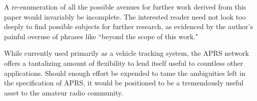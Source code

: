 A re-enumeration of all the possible avenues for further work
derived from this paper would invariably be incomplete.
The interested reader need not look too deeply to find possible subjects
for further research, as evidenced by the author's painful overuse of
phrases like ``beyond the scope of this work."

While currently used primarily as a vehicle tracking system,
the APRS network offers a tantalizing amount of flexibility to lend itself
useful to countless other applications.
Should enough effort be expended to tame the ambiguities left in the
specification of APRS,
it would be positioned to be a tremendously useful asset to the amateur
radio community.
